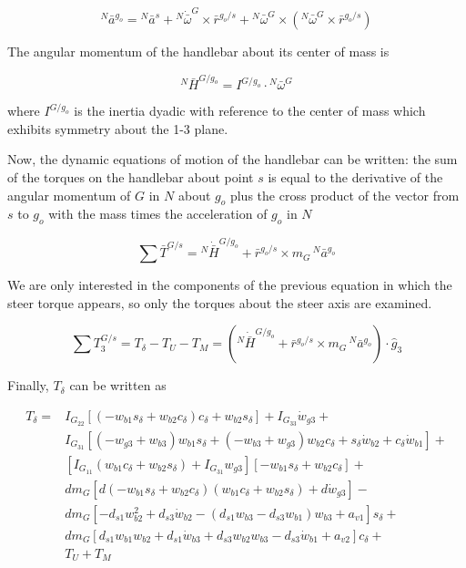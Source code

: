 \documentclass[a4paper]{article}
\begin{document}
\begin{equation}
  ^N\bar{a}^{g_o} = {}^N\bar{a}^s +
    {}^N\dot{\bar{\omega}}^G\times\bar{r}^{g_o/s} +
    {}^N\bar{\omega}^G\times({}^N\bar{\omega}^G\times\bar{r}^{g_o/s})
\end{equation}

The angular momentum of the handlebar about its center of mass is

\begin{equation}
  ^N\bar{H}^{G/g_o} = I^{G/g_o} \cdot {}^N\bar{\omega}^G
\end{equation}

where $I^{G/g_o}$ is the inertia dyadic with reference to the center of
mass which exhibits symmetry about the 1-3 plane.

Now, the dynamic equations of motion of the handlebar can be written:
the sum of the torques on the handlebar about point $s$ is equal to the
derivative of the angular momentum of $G$ in $N$ about $g_o$ plus the
cross product of the vector from $s$ to $g_o$ with the mass times the
acceleration of $g_o$ in $N$ \cite{Meriam1975}

\begin{equation}
  \sum \bar{T}^{G/s} = {}^N\dot{\bar{H}}^{G/g_o} +
    \bar{r}^{g_o/s} \times m_G\,{}^N\bar{a}^{g_o}
\end{equation}

We are only interested in the components of the previous equation in
which the steer torque appears, so only the torques about the steer axis
are examined.

\begin{equation}
  \sum T^{G/s}_3 = T_\delta - T_U - T_M = \left({}^N\dot{\bar{H}}^{G/g_o} +
  \bar{r}^{g_o/s} \times m_G\,{}^N\bar{a}^{g_o}\right) \cdot \hat{g}_3
\end{equation}

Finally, $T_\delta$ can be written as

\begin{align}
  T_{\delta} =
    & I_{G_{22}} \left[ \left( -w_{b1} s_\delta + w_{b2} c_\delta \right)
      c_\delta + w_{b2} s_\delta \right] + I_{G_{33}} \dot{w}_{g3} + \nonumber \\
    & I_{G_{31}} \left[ (-w_{g3} + w_{b3} ) w_{b1} s_\delta +
      (-w_{b3} + w_{g3}) w_{b2} c_\delta +
      s_\delta \dot{w}_{b2} + c_\delta \dot{w}_{b1} \right] + \nonumber \\
    & \left[ I_{G_{11}} (w_{b1} c_\delta + w_{b2}s_\delta) +
      I_{G_{31}} w_{g3} \right] \left[-w_{b1} s_\delta +
      w_{b2} c_\delta \right] + \nonumber \\
    & d m_G \left[ d (-w_{b1} s_\delta + w_{b2} c_\delta)
      (w_{b1} c_\delta + w_{b2} s_\delta) + d \dot{w}_{g3} \right] - \nonumber \\
    & d m_G \left[-d_{s1} w_{b2}^{2} + d_{s3} \dot{w}_{b2} -
      (d_{s1} w_{b3} - d_{s3} w_{b1}) w_{b3} + a_{v1} \right] s_\delta + \nonumber \\
    & d m_G \left[d_{s1} w_{b1} w_{b2} + d_{s1} \dot{w}_{b3} +
      d_{s3} w_{b2} w_{b3} - d_{s3} \dot{w}_{b1} + a_{v2} \right]
      c_\delta + \nonumber \\
    & T_U + T_M
\end{align}
\end{document}
